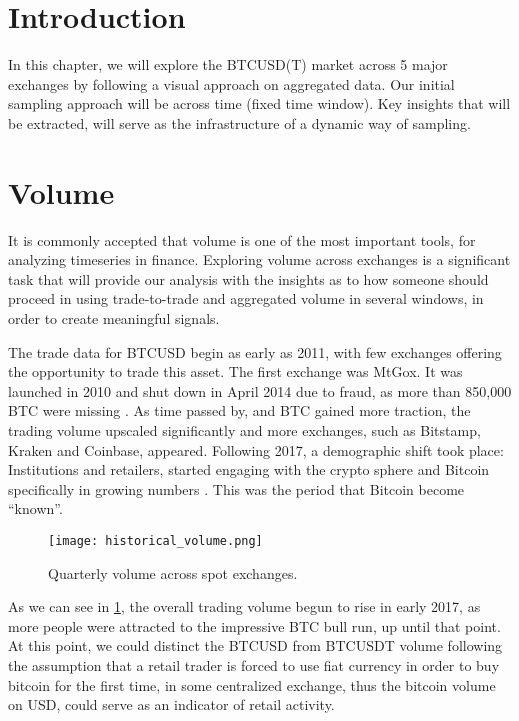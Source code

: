 
\section{Introduction}

In this chapter, we will explore the BTCUSD(T) market across 5 major exchanges by following a visual approach on aggregated data. Our initial sampling approach will be across time (fixed time window). Key insights that will be extracted, will serve as the infrastructure of a dynamic way of sampling. 


\section{Volume}

It is commonly accepted that volume is one of the most important tools, for analyzing timeseries in finance. Exploring volume across exchanges is a significant task that will provide our analysis with the insights as to how someone should proceed in using trade-to-trade and aggregated volume in several windows, in order to create meaningful signals.

The trade data for BTCUSD begin as early as 2011, with few exchanges offering the opportunity to trade this asset. The first exchange was MtGox. It was launched in 2010 and shut down in April 2014 due to fraud, as more than 850,000 BTC were missing \cite{wiki_mt}. As time passed by, and BTC gained more traction, the trading volume upscaled significantly and more exchanges, such as Bitstamp, Kraken and Coinbase, appeared. Following 2017, a demographic shift took place: Institutions and retailers, started engaging with the crypto sphere and Bitcoin specifically in growing numbers \cite{med}. This was the period that Bitcoin become “known”.

\begin{figure}[h]
    \centering
    \texttt{[image: historical\_volume.png]}
    \caption{Quarterly volume across spot exchanges.}
    \label{fig:hist_vol}
\end{figure}


As we can see in \ref{fig:hist_vol}, the overall trading volume begun to rise in early 2017, as more people were attracted to the impressive BTC bull run, up until that point. At this point, we could distinct the BTCUSD from BTCUSDT volume following the assumption that a retail trader is forced to use fiat currency in order to buy bitcoin for the first time, in some centralized exchange, thus the bitcoin volume on USD, could serve as an indicator of retail activity.



